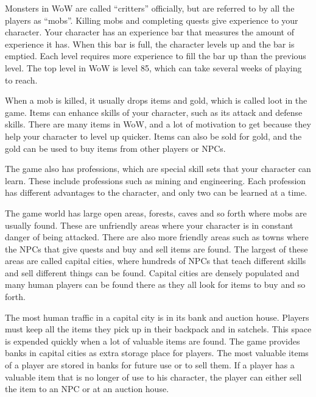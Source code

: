Monsters in WoW are called ``critters'' officially, but are referred to by all the players as ``mobs''. %
 Killing mobs and completing quests give experience to your character. Your character has an experience bar that measures the amount of experience it has. When this bar is full, the character levels up and the bar is emptied. Each level requires more experience to fill the bar up than the previous level. The top level in WoW is level 85, which can take several weeks of playing to reach.

When a mob is killed, it usually drops items and gold, which is called loot in the game. Items can enhance skills of your character, such as its attack and defense skills. There are many items in WoW, and a lot of motivation to get because they help your character to level up quicker. Items can also be sold for gold, and the gold can be used to buy items from other players or NPCs. 

The game also has professions, which are special skill sets that your character can learn. These include professions such as mining and engineering. Each profession has different advantages to the character, and only two can be learned at a time. 

The game world has large open areas, forests, caves and so forth where mobs are usually found. These are unfriendly areas where your character is in constant danger of being attacked. There are also more friendly areas such as towns where the NPCs that give quests and buy and sell items are found. The largest of these areas are called capital cities, where hundreds of NPCs that teach different skills and sell different things can be found. Capital cities are densely populated and many human players can be found there as they all look for items to buy and so forth.

The most human traffic in a capital city is in its bank and auction house. Players must keep all the items they pick up in their backpack and in satchels. This space is expended quickly when a lot of valuable items are found. The game provides banks in capital cities as extra storage place for players. The most valuable items of a player are stored in banks for future use or to sell them. If a player has a valuable item that is no longer of use to his character, the player can either sell the item to an NPC or at an auction house.

